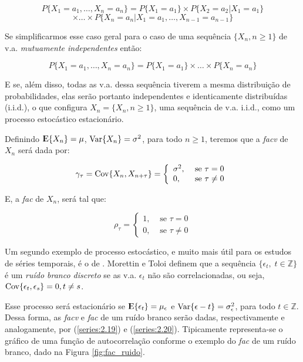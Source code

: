 \[ P\{X_1 = a_1, \ldots, X_n = a_n\} = P\{X_1 = a_1\}\times P\{X_2 = a_2|X_1 = a_1\} \]
\[ \times\ldots\times P\{X_n = a_n|X_1 = a_1, \ldots, X_{n-1} = a_{n-1}\}\]

Se simplificarmos esse caso geral para o caso de uma sequência $\{ X_n , n \geq 1 \}$ de v.a. \emph{mutuamente independentes} então:

\[ P\{X_1 = a_1, \ldots, X_n = a_n\} = P\{X_1 = a_1\}\times\ldots\times P\{X_n = a_n\} \]

E se, além disso, todas as v.a. dessa sequência tiverem a mesma distribuição de probabilidades, elas serão portanto independentes e identicamente distribuídas (i.i.d.), o que configura $X_n = \{ X_n , n \geq 1 \}$, uma sequência de v.a. i.i.d., como um processo estocástico estacionário.

Definindo ${\rm I\kern-.3em E}\{X_n\} = \mu$, $\mathrm{Var}\{X_n\} = \sigma^2$, para todo $n \geq 1$, teremos que a \emph{facv} de $X_n$ será dada por:

\begin{equation}\label{series:2.19}
\gamma_\tau = \mathrm{Cov}\{X_n, X_{n+\tau}\} = \left\{\begin{array}{lr} \sigma^2, & \text{ se } \tau = 0 \\ 0, & \text{ se } \tau \neq 0 \end{array}\right.
\end{equation}

E, a \emph{fac} de $X_n$, será tal que:

\begin{equation}\label{series:2.20}
\rho_\tau = \left\{\begin{array}{lr} 1, & \text{ se } \tau = 0 \\ 0, & \text{ se } \tau \neq 0 \end{array}\right.
\end{equation}

Um segundo exemplo de processo estocástico, e muito mais útil para os estudos de séries temporais, é o de . Morettin e Toloi \citep{morettin} definem que a sequência $\{\epsilon_t,\; t \in \mathbb{Z}\}$ é um \emph{ruído branco discreto} se as v.a. $\epsilon_t$ não são correlacionadas, ou seja, $\mathrm{Cov}\{\epsilon_t, \epsilon_s\} = 0, t \neq s$.

Esse processo será estacionário se ${\rm I\kern-.3em E}\{\epsilon_t\} = \mu_\epsilon$ e $\mathrm{Var}\{\epsilon-t\} = \sigma_\epsilon^2$, para todo $t \in \mathbb{Z}$. Dessa forma, as \emph{facv} e \emph{fac} de um ruído branco serão dadas, respectivamente e analogamente, por (\ref{series:2.19}) e (\ref{series:2.20}). Tipicamente representa-se o gráfico de uma função de autocorrelação conforme o exemplo do \emph{fac} de um ruído branco, dado na Figura \ref{fig:fac_ruido}.

